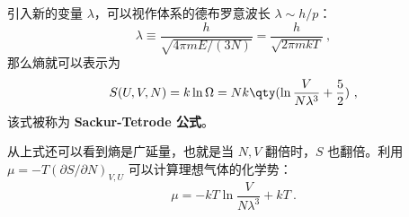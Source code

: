 引入新的变量 $\lambda$，可以视作体系的德布罗意波长 $\lambda\sim h/p$：
\begin{equation}
\lambda \equiv \frac{h}{\sqrt{4\pi mE/(3N)}} = \frac{h}{\sqrt{2\pi mkT}}~,
\end{equation}
那么熵就可以表示为
\begin{equation}\label{eq_IdeaS_2}
S(U, V, N) = k\ln \Omega  = Nk \qty(\ln \frac{V}{N\lambda^3} + \frac52)~,
\end{equation}
该式被称为 \textbf{Sackur-Tetrode 公式}。 

从上式还可以看到熵是广延量，也就是当 $N,V$ 翻倍时，$S$ 也翻倍。利用 $\mu=-T(\partial S/\partial N)_{V,U}$ 可以计算理想气体的化学势：
\begin{equation}
\mu=-kT\ln \frac{V}{N\lambda^3}+kT~.
\end{equation}
